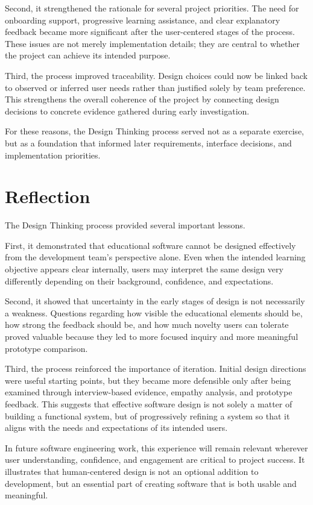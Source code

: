 \documentclass[12pt]{article}
\begin{document}
    Second, it strengthened the rationale for several project priorities. The need for onboarding support, progressive learning assistance, and clear explanatory feedback became more significant after the user-centered stages of the process. These issues are not merely implementation details; they are central to whether the project can achieve its intended purpose.

    Third, the process improved traceability. Design choices could now be linked back to observed or inferred user needs rather than justified solely by team preference. This strengthens the overall coherence of the project by connecting design decisions to concrete evidence gathered during early investigation.

    For these reasons, the Design Thinking process served not as a separate exercise, but as a foundation that informed later requirements, interface decisions, and implementation priorities.

    \section{Reflection}

    The Design Thinking process provided several important lessons.

    First, it demonstrated that educational software cannot be designed effectively from the development team's perspective alone. Even when the intended learning objective appears clear internally, users may interpret the same design very differently depending on their background, confidence, and expectations.

    Second, it showed that uncertainty in the early stages of design is not necessarily a weakness. Questions regarding how visible the educational elements should be, how strong the feedback should be, and how much novelty users can tolerate proved valuable because they led to more focused inquiry and more meaningful prototype comparison.

    Third, the process reinforced the importance of iteration. Initial design directions were useful starting points, but they became more defensible only after being examined through interview-based evidence, empathy analysis, and prototype feedback. This suggests that effective software design is not solely a matter of building a functional system, but of progressively refining a system so that it aligns with the needs and expectations of its intended users.

    In future software engineering work, this experience will remain relevant wherever user understanding, confidence, and engagement are critical to project success. It illustrates that human-centered design is not an optional addition to development, but an essential part of creating software that is both usable and meaningful.
\end{document}
